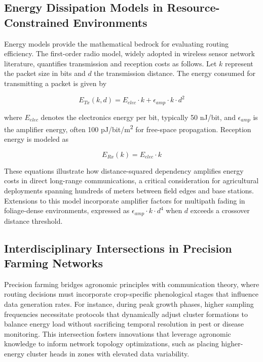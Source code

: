 \documentclass[12pt]{article}
\begin{document}
\subsection{Energy Dissipation Models in Resource-Constrained Environments}

Energy models provide the mathematical bedrock for evaluating routing efficiency. The first-order radio model, widely adopted in wireless sensor network literature, quantifies transmission and reception costs as follows. Let \( k \) represent the packet size in bits and \( d \) the transmission distance. The energy consumed for transmitting a packet is given by

\begin{equation}
E_{Tx}(k, d) = E_{elec} \cdot k + \epsilon_{amp} \cdot k \cdot d^{2}
\end{equation}

where \( E_{elec} \) denotes the electronics energy per bit, typically 50 nJ/bit, and \( \epsilon_{amp} \) is the amplifier energy, often 100 pJ/bit/m\textsuperscript{2} for free-space propagation. Reception energy is modeled as

\begin{equation}
E_{Rx}(k) = E_{elec} \cdot k
\end{equation}

These equations illustrate how distance-squared dependency amplifies energy costs in direct long-range communications, a critical consideration for agricultural deployments spanning hundreds of meters between field edges and base stations. Extensions to this model incorporate amplifier factors for multipath fading in foliage-dense environments, expressed as \( \epsilon_{amp} \cdot k \cdot d^{4} \) when \( d \) exceeds a crossover distance threshold.

\subsection{Interdisciplinary Intersections in Precision Farming Networks}

Precision farming bridges agronomic principles with communication theory, where routing decisions must incorporate crop-specific phenological stages that influence data generation rates. For instance, during peak growth phases, higher sampling frequencies necessitate protocols that dynamically adjust cluster formations to balance energy load without sacrificing temporal resolution in pest or disease monitoring. This intersection fosters innovations that leverage agronomic knowledge to inform network topology optimizations, such as placing higher-energy cluster heads in zones with elevated data variability.
\end{document}
